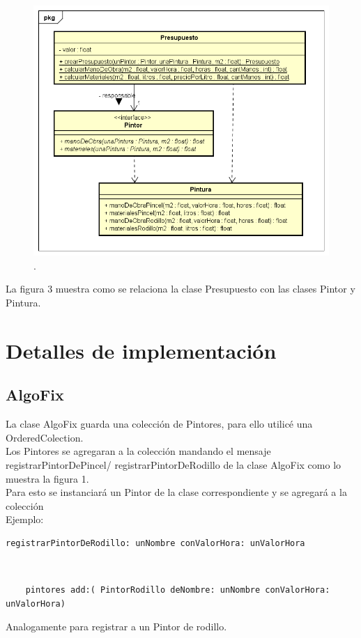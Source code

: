 \documentclass[titlepage,a4paper]{article}
\begin{document}
\begin{figure}[H]
\centering
\includegraphics[width=1\textwidth]{PPP.png}
\caption{\label{fig:class01} .}
\end{figure}
La figura 3 muestra como se relaciona la clase Presupuesto con las clases Pintor y Pintura.
\section{Detalles de implementación}\label{sec:implementacion}

\subsection{AlgoFix}
La clase AlgoFix guarda una colección de Pintores, para ello utilicé una OrderedColection.\\
Los Pintores se agregaran a la colección mandando el mensaje registrarPintorDePincel/ registrarPintorDeRodillo de la clase AlgoFix como lo muestra la figura 1.\\
Para esto se instanciará un Pintor de la clase correspondiente y se agregará a la colección\\
Ejemplo:
\begin{verbatim}
registrarPintorDeRodillo: unNombre conValorHora: unValorHora\end{verbatim}\\\begin{verbatim}
	pintores add:( PintorRodillo deNombre: unNombre conValorHora: unValorHora)
\end{verbatim}
Analogamente para registrar a un Pintor de rodillo.\\
\end{document}
